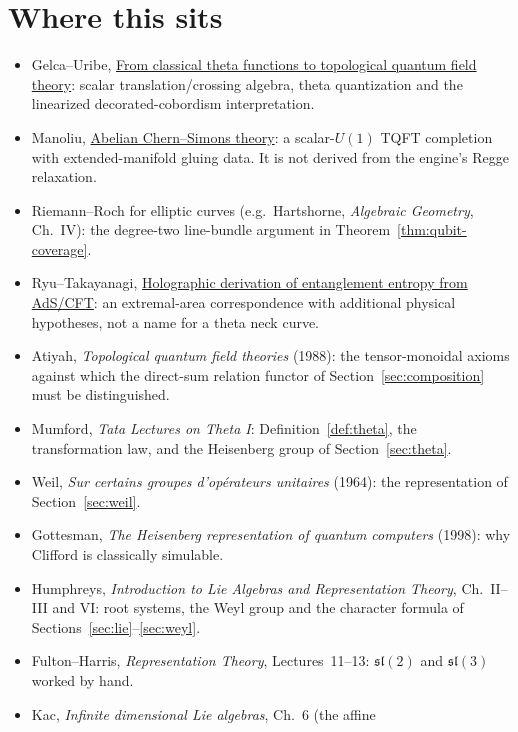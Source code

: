 \documentclass[11pt]{article}
\theoremstyle{definition}
\theoremstyle{remark}
\begin{document}
\section{Where this sits}
\begingroup\small
\begin{itemize}[nosep]
  \item Gelca--Uribe,
    \href{https://arxiv.org/abs/1006.3252}{From classical theta functions to
    topological quantum field theory}: scalar translation/crossing algebra,
    theta quantization and the linearized decorated-cobordism interpretation.
  \item Manoliu,
    \href{https://arxiv.org/abs/dg-ga/9610001}{Abelian Chern--Simons theory}:
    a scalar-$U(1)$ TQFT completion with extended-manifold gluing data.
    It is not derived from the engine's Regge relaxation.
  \item Riemann--Roch for elliptic curves (e.g.\ Hartshorne,
    \emph{Algebraic Geometry}, Ch.~IV): the degree-two line-bundle argument
    in Theorem~\ref{thm:qubit-coverage}.
  \item Ryu--Takayanagi,
    \href{https://arxiv.org/abs/hep-th/0603001}{Holographic derivation of
    entanglement entropy from AdS/CFT}: an extremal-area correspondence
    with additional physical hypotheses, not a name for a theta neck curve.
  \item Atiyah, \emph{Topological quantum field theories} (1988): the
    tensor-monoidal axioms against which the direct-sum relation functor
    of Section~\ref{sec:composition} must be distinguished.
  \item Mumford, \emph{Tata Lectures on Theta I}: Definition~\ref{def:theta},
    the transformation law, and the Heisenberg group of Section~\ref{sec:theta}.
  \item Weil, \emph{Sur certains groupes d'op\'erateurs unitaires} (1964):
    the representation of Section~\ref{sec:weil}.
  \item Gottesman, \emph{The Heisenberg representation of quantum computers}
    (1998): why Clifford is classically simulable.
  \item Humphreys, \emph{Introduction to Lie Algebras and Representation
    Theory}, Ch.~II--III and VI: root systems, the Weyl group and the
    character formula of Sections~\ref{sec:lie}--\ref{sec:weyl}.
  \item Fulton--Harris, \emph{Representation Theory}, Lectures~11--13:
    $\mathfrak{sl}(2)$ and $\mathfrak{sl}(3)$ worked by hand.
  \item Kac, \emph{Infinite dimensional Lie algebras}, Ch.~6 (the affine

\end{itemize}
\end{document}
